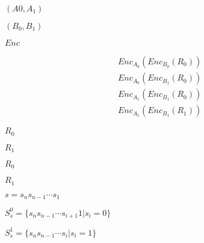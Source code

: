 \documentclass[10pt]{book}
\begin{document}
\begin{mdSnippets}
\begin{mdInlineSnippet}[7407c445772b0d8ed8db3b4147274091]%
$(A{0}, A_{1})$\end{mdInlineSnippet}%
\begin{mdInlineSnippet}%
$(B_{0}, B_{1})$\end{mdInlineSnippet}%
\begin{mdInlineSnippet}[c7d057b625028b0487cc3ef0d269fdd8]%
$Enc$\end{mdInlineSnippet}%
\begin{mdDisplaySnippet}[7f482d1d974c7d7530a2af938323d40d]%
\[%
\begin{aligned}
&Enc_{A_{0}}(Enc_{B_{0}}(R_{0})) \\
&Enc_{A_{0}}(Enc_{B_{1}}(R_{0})) \\
&Enc_{A_{1}}(Enc_{B_{1}}(R_{0})) \\
&Enc_{A_{1}}(Enc_{B_{1}}(R_{1}))
\end{aligned}
\]%
\end{mdDisplaySnippet}%
\begin{mdInlineSnippet}[8a826f776103126e610a820a56d5e102]%
$R_{0}$\end{mdInlineSnippet}%
\begin{mdInlineSnippet}[be473692ca1cbc48985e5e93af6755bf]%
$R_{1}$\end{mdInlineSnippet}%
\begin{mdInlineSnippet}[8a826f776103126e610a820a56d5e102]%
$R_{0}$\end{mdInlineSnippet}%
\begin{mdInlineSnippet}[be473692ca1cbc48985e5e93af6755bf]%
$R_{1}$\end{mdInlineSnippet}%
\begin{mdInlineSnippet}%
$s=s_ns_{n-1}\cdots s_1$\end{mdInlineSnippet}%
\begin{mdInlineSnippet}%
$S_s^0=\{s_ns_{n-1}\cdots s_{i+1}1|s_i=0\}$\end{mdInlineSnippet}%
\begin{mdInlineSnippet}[8a8d028373bd76214e8ce1685765ef6f]%
$S_s^1=\{s_ns_{n-1}\cdots s_{i}|s_i=1\}$\end{mdInlineSnippet}%

\end{mdSnippets}
\end{document}
